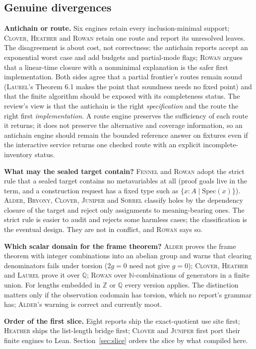 \documentclass[11pt,a4paper]{article}
\newcommand{\Al}{\textsc{Alder}}
\newcommand{\Br}{\textsc{Bryony}}
\newcommand{\Cl}{\textsc{Clover}}
\newcommand{\Fe}{\textsc{Fennel}}
\newcommand{\He}{\textsc{Heather}}
\newcommand{\Ju}{\textsc{Juniper}}
\newcommand{\La}{\textsc{Laurel}}
\newcommand{\Ro}{\textsc{Rowan}}
\newcommand{\So}{\textsc{Sorrel}}
\newcommand{\N}{\mathbb N}
\newcommand{\Z}{\mathbb Z}
\newcommand{\Q}{\mathbb Q}
\theoremstyle{definition}
\theoremstyle{plain}
\begin{document}
\subsection{Genuine divergences}
\textbf{Antichain or route.} Six engines retain every inclusion-minimal support; \Cl, \He{} and \Ro{} retain one route and report its unresolved leaves. The disagreement is about cost, not correctness: the antichain reports accept an exponential worst case and add budgets and partial-mode flags; \Ro{} argues that a linear-time closure with a nonminimal explanation is the safer first implementation. Both sides agree that a partial frontier's routes remain sound (\La's Theorem 6.1 makes the point that soundness needs no fixed point) and that the finite algorithm should be exposed with its completeness status. The review's view is that the antichain is the right \emph{specification} and the route the right first \emph{implementation}. A route engine preserves the sufficiency of each route it returns; it does not preserve the alternative and coverage information, so an antichain engine should remain the bounded reference answer on fixtures even if the interactive service returns one checked route with an explicit incomplete-inventory status.

\textbf{What may the sealed target contain?} \Fe{} and \Ro{} adopt the strict rule that a sealed target contains no metavariables at all (proof goals live in the term, and a construction request has a fixed type such as $\{x:A\mid\mathrm{Spec}(x)\}$). \Al, \Br, \Cl, \Ju{} and \So{} classify holes by the dependency closure of the target and reject only assignments to meaning-bearing ones. The strict rule is easier to audit and rejects some harmless cases; the classification is the eventual design. They are not in conflict, and \Ro{} says so.

\textbf{Which scalar domain for the frame theorem?} \Al{} proves the frame theorem with integer combinations into an abelian group and warns that clearing denominators fails under torsion ($2g=0$ need not give $g=0$); \Cl, \He{} and \La{} prove it over $\Q$; \Ro{} over $\N$-combinations of generators in a finite union. For lengths embedded in $\Z$ or $\Q$ every version applies. The distinction matters only if the observation codomain has torsion, which no report's grammar has; \Al's warning is correct and currently moot.

\textbf{Order of the first slice.} Eight reports ship the exact-quotient use site first; \He{} ships the list-length bridge first; \Cl{} and \Ju{} first port their finite engines to Lean. Section~\ref{sec:slice} orders the slice by what compiled here.
\end{document}

